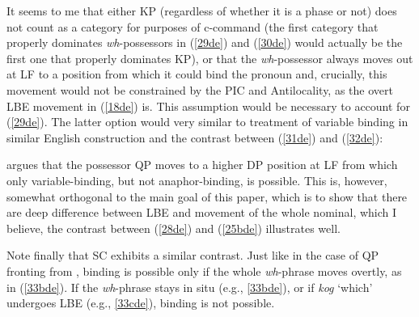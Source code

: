 \documentclass[output=paper]{langscibook}
\begin{document}
It seems to me that either KP (regardless of whether it is a phase or not) does not count as a category for purposes of c-command (the first category that properly dominates \textit{wh}-possessors in (\ref{29de}) and (\ref{30de}) would actually be the first one that properly dominates KP), or that the \textit{wh}-possessor always moves out at LF to a position from which it could bind the pronoun and, crucially, this movement would not be constrained by the PIC and Antilocality, as the overt LBE movement in (\ref{18de}) is. This assumption would be necessary to account for (\ref{29de}). The latter option would very similar to  treatment of variable binding in similar English construction and the contrast between (\ref{31de}) and (\ref{32de}):

\begin{exe}

\end{exe}

\citet{Kayne1994} argues that the possessor QP moves to a higher DP position at LF from which only variable-binding, but not anaphor-binding, is possible. This is, however, somewhat orthogonal to the main goal of this paper, which is to show that there are deep difference between LBE and movement of the whole nominal, which I believe, the contrast between (\ref{28de}) and (\ref{25bde}) illustrates well. 

Note finally that SC exhibits a similar contrast. Just like in the case of QP fronting from , binding is possible only if the whole \textit{wh}-phrase moves overtly, as in (\ref{33bde}). If the \textit{wh}-phrase stays in situ (e.g., \ref{33bde}), or if \textit{kog} ‘which’ undergoes LBE (e.g., \ref{33cde}), binding is not possible.

\begin{exe}
\ex \label{33de}
\begin{xlist}


 

\end{xlist}
\end{exe}
\end{document}
